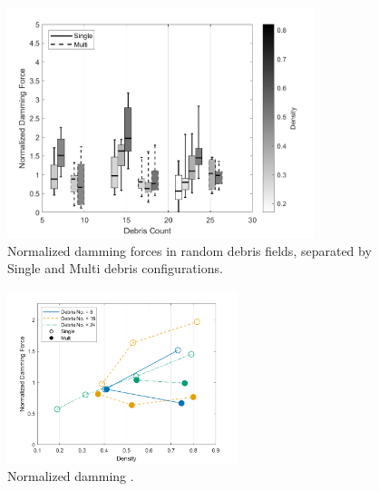 \documentclass{article}
\begin{document}
\begin{figure}[htbp]
    \centering
    \includegraphics[width=0.8\textwidth]{Damming_Random_Single_vs_Multi_ByDensityGradient.png}
    \caption{Normalized damming forces in random debris fields, separated by Single and Multi debris configurations.}
    \label{fig:random_damming_gradient}
\end{figure}
\begin{figure}[htbp]
    \centering
    \includegraphics[width=0.6\textwidth]{figures/Damming_Peaks_densities_combined.png}
    \caption{Normalized damming .}
    \label{fig:damming_peaks}
\end{figure}


\end{document}
